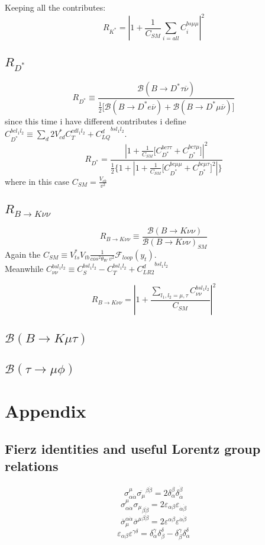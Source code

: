 \documentclass{article}
\begin{document}
Keeping all the contributes:
\[
R_{K^*} =|1+ \frac{1}{C_{SM}}  \sum_{i=all} C_i^{bs \mu \mu}  |^2
\]

\subsection{$R_{D^*}$}
\[
R_{D^*} \equiv \frac{\mathcal{B}(B \rightarrow D^* \tau  \overline{\nu})}{\frac{1}{2} \big[ \mathcal{B}(B \rightarrow D^* e \overline{\nu} ) + \mathcal{B}(B \rightarrow D^* \mu \overline{\nu} )  \big] }
\]
since this time i have different contributes i define $C_{D^*}^{b c  l_1 l_2} \equiv  \sum_d 2 V^*_{cd}C_T ^{c d  l_1 l_2} + {C^d_{LQ}}^{bs l_1 l_2} $.
\[
R_{D^*} = \frac{|1 +  \frac{1}{C_{SM}}\big[C_{D^*}^{bc \tau \tau }+ C_{D^*}^{bc \tau \mu } \big] |^2}{ \frac{1}{2} \big\{ 1 + |1 + \frac{1}{C_{SM}} \big[ C_{D^*}^{bc \mu \mu} + C_{D^*}^{bc \mu \tau} \big]^2 | \big\} }
\]
where in this case $C_{SM}= \frac{V_{cb}}{v^2}$

\subsection{$R_{B\rightarrow K \nu \nu}$}
\[
R_{B\rightarrow K \nu \nu} \equiv \frac{\mathcal{B}(B\rightarrow K \nu \nu)}{\mathcal{B}(B\rightarrow K \nu \nu)_{SM}}
\]
Again the $C_{SM} \equiv V_{ts}^* V_{tb} \frac{1}{cos^2 \theta_W \ v^2} \mathcal{F}_{loop}(y_t)$.\\
Meanwhile $C_{\nu \nu}^{bs l_1 l_2} \equiv C_S^{bsl_1 l_2} - C_T^{bsl_1 l_2} + {C_{LR2}^d}^{bsl_1 l_2}$

\[
R_{B\rightarrow K \nu \nu} =  |1+ \frac{\sum_{l_1, l_2 = \mu , \tau} C_{\nu \nu}^{bsl_1 l_2}}{C_{SM}}|^2
\]

\subsection{$\mathcal{B}(B \rightarrow K \mu \tau)$}
\subsection{$\mathcal{B}(\tau \rightarrow \mu \phi)$}




\section{Appendix}
\subsection{Fierz identities and useful Lorentz group relations}
\[
\sigma_{\alpha \dot{\alpha}}^\mu \overline{\sigma_\mu}^{\beta \dot{\beta}}= 2\delta^\beta_\alpha \delta^{\dot{\beta}}_{\dot{\alpha}}
\]
\[
\sigma_{\alpha \dot{\alpha}}^\mu {\sigma_{\mu}}_{\beta \dot{\beta}}= 2 \varepsilon_{\alpha \beta} \varepsilon_{\dot{\alpha} \dot{\beta}} 
\]
\[
\overline{\sigma}_\mu^{\alpha \dot{\alpha}} {\overline{\sigma}^{\mu}}^{\beta \dot{\beta}}= 2 \varepsilon^{\alpha \beta} \varepsilon^{\dot{\alpha} \dot{\beta}} 
\]
\[
\varepsilon_{\alpha \beta} \varepsilon^{\gamma \delta} = \delta_\alpha^\gamma \delta_\beta^\delta - \delta_\beta^\gamma \delta_\alpha^\delta
\]
\end{document}
